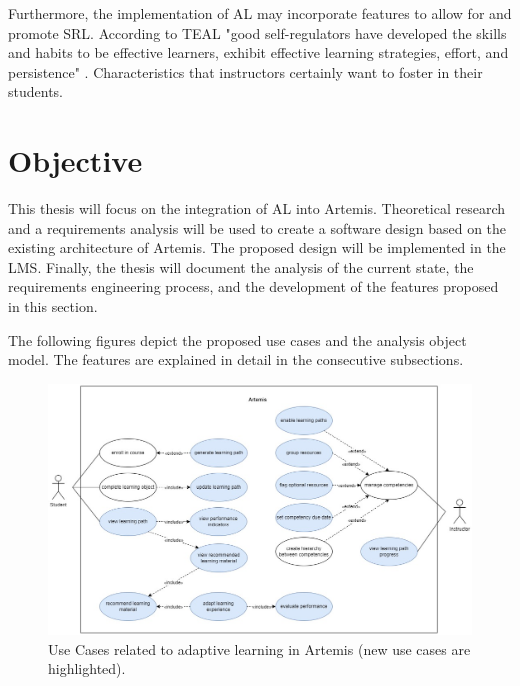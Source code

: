 \documentclass[a4paper,12pt,twoside]{article}
\begin{document}
Furthermore, the implementation of \ac{AL} may incorporate features to allow for and promote \ac{SRL}. According to TEAL
"good self-regulators have developed the skills and habits to be effective learners, exhibit effective learning strategies, effort, and persistence" \cite{no2012self}.
Characteristics that instructors certainly want to foster in their students.


\section{Objective}

This thesis will focus on the integration of \ac{AL} into Artemis.
Theoretical research and a requirements analysis will be used to create a software design based on the existing architecture of Artemis. The proposed
design will be implemented in the \ac{LMS}. Finally, the thesis will document the analysis of the current state, the requirements engineering process,
and the development of the features proposed in this section.

The following figures depict the proposed use cases and the analysis object model. The features are explained in detail in the consecutive subsections.

\begin{figure}[h!]
        \centering
        \includegraphics[width=\linewidth]{figures/UseCases(3).jpg}
        \caption{Use Cases related to adaptive learning in Artemis (new use cases are highlighted).}
        \label{fig:UseCases}
\end{figure}
\end{document}
